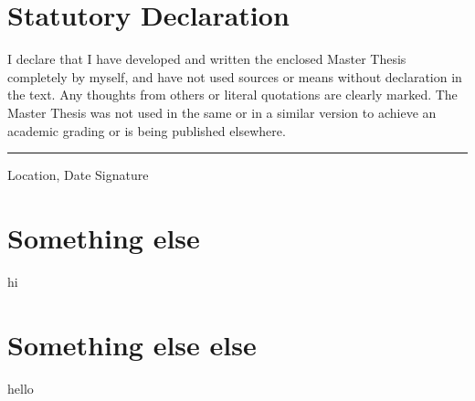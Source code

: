 \documentclass[12pt, twoside]{report}
\begin{document}
\appendix
\chapter{Statutory Declaration}
I declare that I have developed and written the enclosed Master Thesis completely by myself, and have not used sources or means without declaration in the text. Any thoughts from others or literal quotations are clearly marked. The Master Thesis was not used in the same or in a similar version to achieve an academic grading or is being published elsewhere.
\newline
\newline
\newline
\rule{\textwidth}{1pt}
Location, Date \hfill Signature 

\chapter{Something else}
hi

\chapter{Something else else}
hello

\printbibliography
\end{document}
